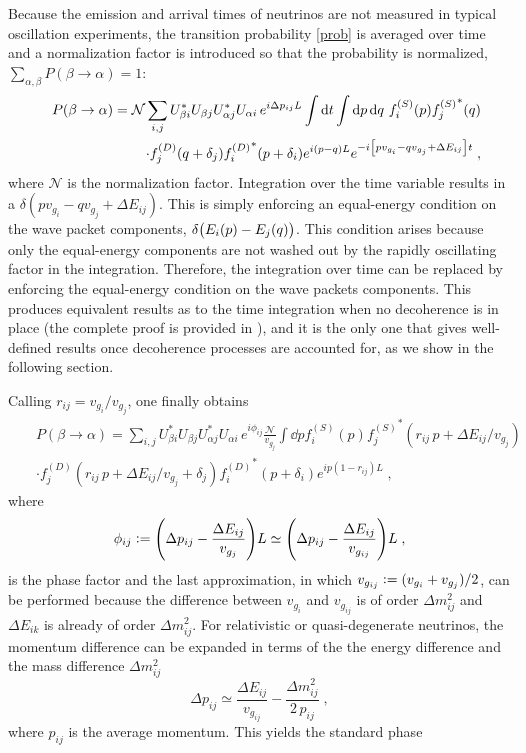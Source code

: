 \documentclass[11pt]{article}
\newcommand{\ebd}{\vcentcolon =}
\newcommand{\inttt}[1]{\int\dd{#1}}
\begin{document}
Because the emission and arrival times of neutrinos are not measured in typical oscillation experiments, the transition probability \eqref{prob} is averaged over time \cite{Akhmedov:2009rb} and a normalization factor is introduced so that the probability is normalized, $\sum_{\alpha,\beta} P(\beta\to \alpha) = 1$:
\begin{eqnarray}\label{probbb}
    &&P(\beta\to\alpha) = \mathcal{N}\sum_{i,j} U^*_{\beta i} U_{\beta j} U^*_{\alpha j} U_{\alpha i} \,e^{i\Delta p_{ij}L} \inttt{t}\inttt{p}\dd{q}\,f_i^{(S)}(p){f_j^{(S)}}^*(q) \nonumber \\ &&\cdot f_j^{(D)}(q+\delta_j) {f_i^{(D)}}^*(p+\delta_i) e^{i(p-q)L} e^{-i\qty[pv_{g_i}-qv_{g_j}+\Delta E_{ij}]t}\;,
\end{eqnarray}
where $\mathcal{N}$ is the normalization factor. Integration over the time variable results in a $\delta(pv_{g_i}-qv_{g_j}+\Delta E_{ij})$. This is simply enforcing an equal-energy condition on the wave packet components, $\delta\qty(E_i(p)-E_j(q))$. This condition arises because only the equal-energy components are not washed out by the rapidly oscillating factor in the integration. Therefore, the integration over time can be replaced by enforcing the equal-energy condition on the wave packets components. This produces equivalent results as to the time integration when no decoherence is in place (the complete proof is provided in \cite{PhDVittorio}), and it is the only one that gives well-defined results once decoherence processes are accounted for, as we show in the following section. 

Calling $r_{ij}=v_{g_i}/v_{g_j}$, one finally obtains
\begin{eqnarray}
    &&P(\beta\to\alpha) = \sum_{i,j} U^*_{\beta i} U_{\beta j} U^*_{\alpha j} U_{\alpha i} \,e^{i \phi_{ij}} \frac{\mathcal{N}}{v_{g_j}}\inttt{p} f_i^{(S)}(p) {f_j^{(S)}}^*(r_{ij}\,p+\Delta E_{ij}/v_{g_j}) \nonumber \\ &&\cdot f_j^{(D)}(r_{ij}\,p+\Delta E_{ij}/v_{g_j}+\delta_j) {f_i^{(D)}}^*(p+\delta_i) e^{ip(1-r_{ij})L}\;,\label{oscillation probability standard wave-packet final}
\end{eqnarray}
where
\begin{equation}
    \phi_{ij} \ebd \qty(\Delta p_{ij}-\frac{\Delta E_{ij}}{v_{g_j}})L \simeq  \qty(\Delta p_{ij}-\frac{\Delta E_{ij}}{v_{g_{ij}}})L\;,
\end{equation}
is the phase factor and the last approximation, in which $v_{g_{ij}} \ebd (v_{g_i}+v_{g_j})/2$, can be performed because the difference between $v_{g_i}$ and $v_{g_{ij}}$ is of order $\Delta m^2_{ij}$ and $\Delta E_{ik}$ is already of order $\Delta m^2_{ij}$. For relativistic or quasi-degenerate neutrinos, the momentum difference can be expanded in terms of the the energy difference and the mass difference $\Delta m^2_{ij}$
\begin{equation}
    \Delta p_{ij} \simeq \frac{\Delta E_{ij}}{v_{g_{ij}}} - \frac{\Delta m^2_{ij}}{2\,p_{ij}}\;,
\end{equation}
where $p_{ij}$ is the average momentum. This yields the standard phase
\end{document}
